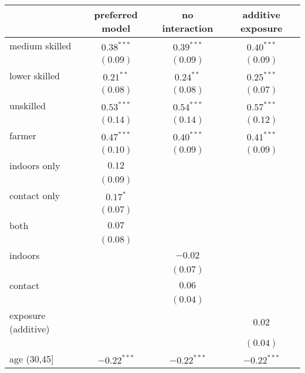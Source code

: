 
\begin{table}
\begin{center}
\begin{tabular}{l c c c}
\hline
 & preferred model & no interaction & additive exposure \\
\hline
medium skilled      & $0.38^{***}$  & $0.39^{***}$  & $0.40^{***}$  \\
                    & $(0.09)$      & $(0.09)$      & $(0.09)$      \\
lower skilled       & $0.21^{**}$   & $0.24^{**}$   & $0.25^{***}$  \\
                    & $(0.08)$      & $(0.08)$      & $(0.07)$      \\
unskilled           & $0.53^{***}$  & $0.54^{***}$  & $0.57^{***}$  \\
                    & $(0.14)$      & $(0.14)$      & $(0.12)$      \\
farmer              & $0.47^{***}$  & $0.40^{***}$  & $0.41^{***}$  \\
                    & $(0.10)$      & $(0.09)$      & $(0.09)$      \\
indoors only        & $0.12$        &               &               \\
                    & $(0.09)$      &               &               \\
contact only        & $0.17^{*}$    &               &               \\
                    & $(0.07)$      &               &               \\
both                & $0.07$        &               &               \\
                    & $(0.08)$      &               &               \\
indoors             &               & $-0.02$       &               \\
                    &               & $(0.07)$      &               \\
contact             &               & $0.06$        &               \\
                    &               & $(0.04)$      &               \\
exposure (additive) &               &               & $0.02$        \\
                    &               &               & $(0.04)$      \\
age (30,45]         & $-0.22^{***}$ & $-0.22^{***}$ & $-0.22^{***}$ \\

\end{tabular}
\end{center}
\end{table}

